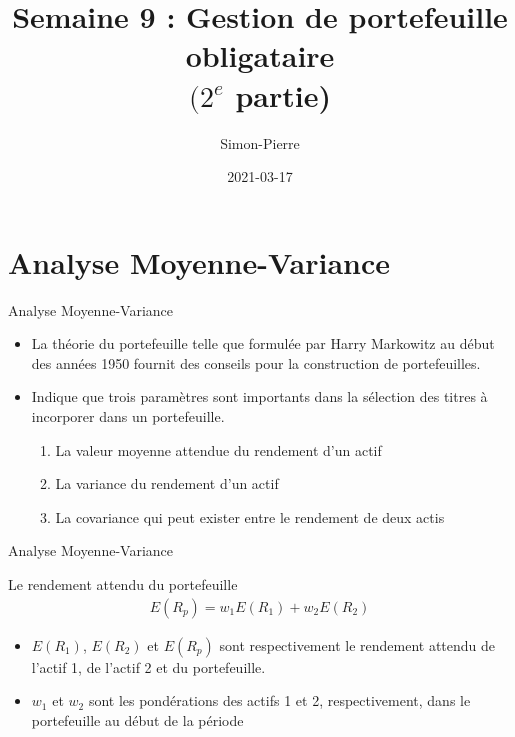\documentclass[10pt,a4paper]{beamer}
\title{Semaine 9 : Gestion de portefeuille obligataire \\ $(2^{e}$ partie)}
\date{2021-03-17}
\author{Simon-Pierre}
\institute{Université Laval}
\begin{document}
\begin{frame}
\titlepage
\end{frame}

\begin{frame}
\tableofcontents
\end{frame}

\section{Analyse Moyenne-Variance}

\begin{frame}{Analyse Moyenne-Variance}
\begin{itemize}[label=\bullet]
\item La théorie du portefeuille telle que formulée par Harry Markowitz au début des années 1950 fournit des conseils pour la construction de portefeuilles.
\item Indique que trois paramètres sont importants dans la sélection des titres à incorporer dans un portefeuille.
\begin{enumerate}[label=\arabic*)]
\item La valeur moyenne attendue du rendement d'un actif 
\item La variance du rendement d’un actif
\item La covariance qui peut exister entre le rendement de deux actis
\end{enumerate}
\end{itemize}
\end{frame}




\begin{frame}{Analyse Moyenne-Variance}
\begin{block}{Le rendement attendu du portefeuille}
\begin{align*}
E(R_p)=w_1 E(R_1)+w_2 E(R_2)
\end{align*}
\end{block}
\vspace{0.5cm}
\begin{itemize}[label=\bullet]
\item $E(R_1)$, $E(R_2)$ et $E(R_p)$ sont respectivement le rendement attendu de l'actif 1, de l'actif 2 et du portefeuille.
\item $w_1$ et $w_2$ sont les pondérations des actifs 1 et 2, respectivement, dans le portefeuille au début de la période
\end{itemize}
\end{frame}
\end{document}

